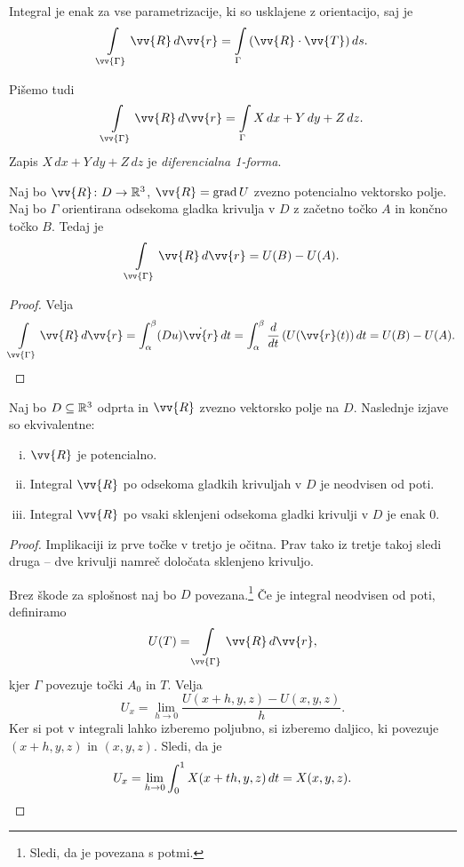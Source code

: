 \begin{opomba}
Integral je enak za vse parametrizacije, ki so usklajene z
orientacijo, saj je
\[
\lint_{\vv{\Gamma}} \vv{R}\,d\vv{r} =
\lint_\Gamma \left(\vv{R} \cdot \vv{T}\right)ds.
\]
\end{opomba}

\begin{opomba}
Pišemo tudi
\[
\lint_{\vv{\Gamma}} \vv{R}\,d\vv{r} =
\lint_\Gamma X\,dx + Y\,dy + Z\,dz.
\]
Zapis $X\,dx + Y\,dy + Z\,dz$ je \emph{diferencialna 1-forma}.
\end{opomba}

\begin{trditev}
Naj bo $\vv{R} \colon D \to \R^3$, $\vv{R} = \grad U$ zvezno
potencialno vektorsko polje. Naj bo $\Gamma$ orientirana odsekoma
gladka krivulja v $D$ z začetno točko $A$ in končno točko $B$.
Tedaj je
\[
\lint_{\vv{\Gamma}} \vv{R}\,d\vv{r} =
U(B) - U(A).
\]
\end{trditev}

\begin{proof}
Velja
\[
\lint_{\vv{\Gamma}} \vv{R}\,d\vv{r} =
\int_\alpha^\beta (Du) \dot{\vv{r}}\,dt =
\int_\alpha^\beta \frac{d}{dt} \left(U(\vv{r}(t)\right)dt =
U(B) - U(A). \qedhere
\]
\end{proof}

\begin{izrek}
Naj bo $D \subseteq \mathbb{R}^3$ odprta in $\vv{R}$ zvezno vektorsko polje
na $D$. Naslednje izjave so ekvivalentne:

\begin{enumerate}[i)]
\item $\vv{R}$ je potencialno.
\item Integral $\vv{R}$ po odsekoma gladkih krivuljah v $D$ je
neodvisen od poti.
\item Integral $\vv{R}$ po vsaki sklenjeni odsekoma gladki krivulji
v $D$ je enak $0$.
\end{enumerate}
\end{izrek}


\begin{proof}
Implikaciji iz prve točke v tretjo je očitna. Prav tako iz tretje
takoj sledi druga -- dve krivulji namreč določata sklenjeno 
krivuljo.

Brez škode za splošnost naj bo $D$ povezana.\footnote{Sledi, da je
povezana s potmi.} Če je integral neodvisen od poti, definiramo
\[
U(T) = \lint_{\vv{\Gamma}} \vv{R}\,d\vv{r},
\]
kjer $\Gamma$ povezuje točki $A_0$ in $T$. Velja
\[
U_x = \lim_{h \to 0} \frac{U(x+h, y, z) - U(x, y, z)}{h}.
\]
Ker si pot v integrali lahko izberemo poljubno, si izberemo
daljico, ki povezuje $(x+h, y, z)$ in $(x, y, z)$. Sledi, da je
\[
U_x =
\lim_{h \to 0} \int_0^1 X(x + th, y, z)\,dt =
X(x, y, z). \qedhere
\]
\end{proof}


